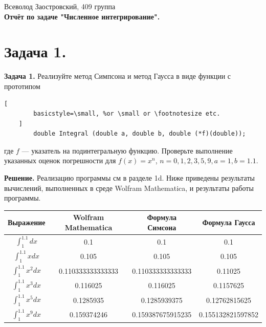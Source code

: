 \documentclass[14pt,a4paper]{extarticle}
\newcommand{\1}{\mathbbm{1}}
\begin{document}
\begin{center}

    {Всеволод Заостровский, 409 группа}\\
    {\bfseries Отчёт по задаче "Численное интегрирование".\\}
    \vspace{1cm}

\end{center}

\section{\textbf{Задача 1.}}

\textbf{Задача 1.} Реализуйте метод Симпсона и метод Гаусса в виде функции с прототипом
\begin{lstlisting}[
        basicstyle=\small, %or \small or \footnotesize etc.
    ]
        double Integral (double a, double b, double (*f)(double));
    \end{lstlisting}
где $f$ — указатель на подинтегральную функцию. Проверьте выполнение указанных оценок
погрешности для $f(x) = x^n$, ${n = 0, 1, 2, 3, 5, 9, a = 1, b = 1.1}$. \par
\textbf{Решение.}  Реализацию программы см в разделе 1d. Ниже приведены результаты вычислений, выполненных в среде Wolfram Mathematica, 
и результаты работы программы. \\
\begin{tabular}{||c c c c||} 
    \hline
    Выражение & Wolfram Mathematica & Формула Симсона & Формула Гаусса \\ [0.5ex] 
    \hline\hline
    $\int_{1}^{1.1} dx$ & 0.1 & 0.1 & 0.1 \\ 
    \hline
    $\int_{1}^{1.1} x dx$ & 0.105 & 0.105 & 0.105 \\
    \hline
    $\int_{1}^{1.1} x^2 dx$ & 0.110333333333333 & 0.110333333333333 & 0.11025 \\
    \hline
    $\int_{1}^{1.1} x^3 dx$ & 0.116025 & 0.116025 & 0.1157625 \\
    \hline
    $\int_{1}^{1.1} x^5 dx$ & 0.1285935 & 0.1285939375 & 0.12762815625 \\ [1ex] 
    \hline
    $\int_{1}^{1.1} x^9 dx$ & 0.159374246 & 0.159387675915235 & 0.155132821597852 \\ [1ex] 
    \hline
   \end{tabular}
   
\end{document}
